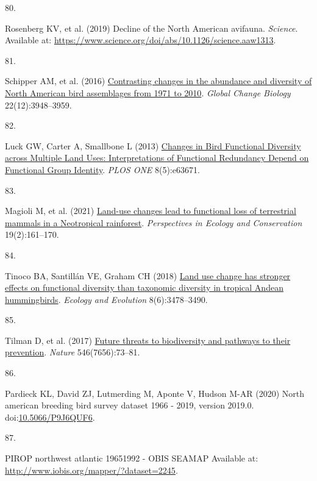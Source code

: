 \documentclass{article}
\newlength{\cslhangindent}
\newlength{\csllabelwidth}
\newlength{\cslentryspacingunit} %
\newenvironment{CSLReferences}[2] %
 {%
  \setlength{\parindent}{0pt}
  \ifodd #1
  \let\oldpar\par
  \def\par{\hangindent=\cslhangindent\oldpar}
  \fi
  \setlength{\parskip}{#2\cslentryspacingunit}
 }%
 {}
\newcommand{\CSLLeftMargin}[1]{\parbox[t]{\csllabelwidth}{#1}}
\newcommand{\CSLRightInline}[1]{\parbox[t]{\linewidth - \csllabelwidth}{#1}\break}
\begin{document}
\begin{CSLReferences}{0}{0}
\leavevmode{}%
\CSLLeftMargin{80. }%
\CSLRightInline{Rosenberg KV, et al. (2019) Decline of the North
American avifauna. \emph{Science}. Available at:
\url{https://www.science.org/doi/abs/10.1126/science.aaw1313}.}

\leavevmode{}%
\CSLLeftMargin{81. }%
\CSLRightInline{Schipper AM, et al. (2016)
\href{https://doi.org/10.1111/gcb.13292}{Contrasting changes in the
abundance and diversity of North American bird assemblages from 1971 to
2010}. \emph{Global Change Biology} 22(12):3948--3959.}

\leavevmode{}%
\CSLLeftMargin{82. }%
\CSLRightInline{Luck GW, Carter A, Smallbone L (2013)
\href{https://doi.org/10.1371/journal.pone.0063671}{Changes in Bird
Functional Diversity across Multiple Land Uses: Interpretations of
Functional Redundancy Depend on Functional Group Identity}. \emph{PLOS
ONE} 8(5):e63671.}

\leavevmode{}%
\CSLLeftMargin{83. }%
\CSLRightInline{Magioli M, et al. (2021)
\href{https://doi.org/10.1016/j.pecon.2021.02.006}{Land-use changes lead
to functional loss of terrestrial mammals in a Neotropical rainforest}.
\emph{Perspectives in Ecology and Conservation} 19(2):161--170.}

\leavevmode{}%
\CSLLeftMargin{84. }%
\CSLRightInline{Tinoco BA, Santillán VE, Graham CH (2018)
\href{https://doi.org/10.1002/ece3.3813}{Land use change has stronger
effects on functional diversity than taxonomic diversity in tropical
Andean hummingbirds}. \emph{Ecology and Evolution} 8(6):3478--3490.}

\leavevmode{}%
\CSLLeftMargin{85. }%
\CSLRightInline{Tilman D, et al. (2017)
\href{https://doi.org/10.1038/nature22900}{Future threats to
biodiversity and pathways to their prevention}. \emph{Nature}
546(7656):73--81.}

\leavevmode{}%
\CSLLeftMargin{86. }%
\CSLRightInline{Pardieck KL, David ZJ, Lutmerding M, Aponte V, Hudson
M-AR (2020) North american breeding bird survey dataset 1966 - 2019,
version 2019.0.
doi:\href{https://doi.org/10.5066/P9J6QUF6}{10.5066/P9J6QUF6}.}

\leavevmode{}%
\CSLLeftMargin{87. }%
\CSLRightInline{PIROP northwest atlantic 1965{\textendash}1992 - OBIS
SEAMAP Available at: \url{http://www.iobis.org/mapper/?dataset=2245}.}


\end{CSLReferences}
\end{document}
